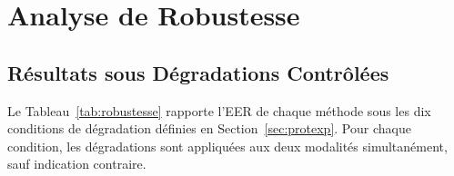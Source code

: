 \documentclass[12pt,a4paper]{report}
\begin{document}
\section{Analyse de Robustesse}
\label{sec:robustesse-ch3}

\subsection{R\'{e}sultats sous D\'{e}gradations Contr\^{o}l\'{e}es}

Le Tableau~\ref{tab:robustesse} rapporte l'EER de chaque m\'{e}thode sous les dix conditions de d\'{e}gradation d\'{e}finies en Section~\ref{sec:protexp}. Pour chaque condition, les d\'{e}gradations sont appliqu\'{e}es aux deux modalit\'{e}s simultan\'{e}ment, sauf indication contraire.

\begin{table}[htbp]
    \centering
    \caption{EER (\%) sous dix conditions de d\'{e}gradation. Best et Second-best en gras et italique. U = UFM-Transformer, C = Concat\'{e}nation, A = Cross-Attention, D = DenseNet-Fusion, V = ResNet-18 visage, E = ResNet-18 empreinte.}
    \label{tab:robustesse}
\end{table}
\end{document}
